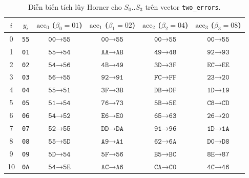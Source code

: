 \documentclass[11pt,a4paper]{report}
\begin{document}
\begin{table}[!htb]
\centering
\caption{Diễn biến tích lũy Horner cho $S_0..S_3$ trên vector \texttt{two\_errors}.}
\label{tab:worked_horner}
\scriptsize
\setlength{\tabcolsep}{4pt}
\renewcommand{\arraystretch}{0.96}
\begin{tabular}{@{} c c c c c c @{}}
\toprule
$i$ & $y_i$ & $\text{acc}_0$ ($\beta_0=\text{01}$) & $\text{acc}_1$ ($\beta_1=\text{02}$) & $\text{acc}_2$ ($\beta_2=\text{04}$) & $\text{acc}_3$ ($\beta_3=\text{08}$) \\
\midrule
0  & \texttt{55} & $\texttt{00} \to \texttt{55}$ & $\texttt{00} \to \texttt{55}$ & $\texttt{00} \to \texttt{55}$ & $\texttt{00} \to \texttt{55}$ \\
1  & \texttt{01} & $\texttt{55} \to \texttt{54}$ & $\texttt{AA} \to \texttt{AB}$ & $\texttt{49} \to \texttt{48}$ & $\texttt{92} \to \texttt{93}$ \\
2  & \texttt{02} & $\texttt{54} \to \texttt{56}$ & $\texttt{4B} \to \texttt{49}$ & $\texttt{3D} \to \texttt{3F}$ & $\texttt{EC} \to \texttt{EE}$ \\
3  & \texttt{03} & $\texttt{56} \to \texttt{55}$ & $\texttt{92} \to \texttt{91}$ & $\texttt{FC} \to \texttt{FF}$ & $\texttt{23} \to \texttt{20}$ \\
4  & \texttt{04} & $\texttt{55} \to \texttt{51}$ & $\texttt{3F} \to \texttt{3B}$ & $\texttt{DB} \to \texttt{DF}$ & $\texttt{1D} \to \texttt{19}$ \\
5  & \texttt{05} & $\texttt{51} \to \texttt{54}$ & $\texttt{76} \to \texttt{73}$ & $\texttt{5B} \to \texttt{5E}$ & $\texttt{C8} \to \texttt{CD}$ \\
6  & \texttt{06} & $\texttt{54} \to \texttt{52}$ & $\texttt{E6} \to \texttt{E0}$ & $\texttt{65} \to \texttt{63}$ & $\texttt{26} \to \texttt{20}$ \\
7  & \texttt{07} & $\texttt{52} \to \texttt{55}$ & $\texttt{DD} \to \texttt{DA}$ & $\texttt{91} \to \texttt{96}$ & $\texttt{1D} \to \texttt{1A}$ \\
8  & \texttt{08} & $\texttt{55} \to \texttt{5D}$ & $\texttt{A9} \to \texttt{A1}$ & $\texttt{62} \to \texttt{6A}$ & $\texttt{D0} \to \texttt{D8}$ \\
9  & \texttt{09} & $\texttt{5D} \to \texttt{54}$ & $\texttt{5F} \to \texttt{56}$ & $\texttt{B5} \to \texttt{BC}$ & $\texttt{8E} \to \texttt{87}$ \\
10 & \texttt{0A} & $\texttt{54} \to \texttt{5E}$ & $\texttt{AC} \to \texttt{A6}$ & $\texttt{CA} \to \texttt{C0}$ & $\texttt{4C} \to \texttt{46}$ \\

\end{tabular}
\end{table}
\end{document}
